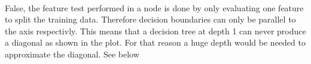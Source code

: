 %
%
\\
False, the feature test performed in a node is done by only evaluating one feature to split the training data. Therefore decision boundaries can only be parallel to the axis respectivly. This means that a decision tree at depth 1 can never produce a diagonal as shown in the plot. For that reason a huge depth would be needed to approximate the diagonal.
%
%
%
%
%
%
 See below
%

%



